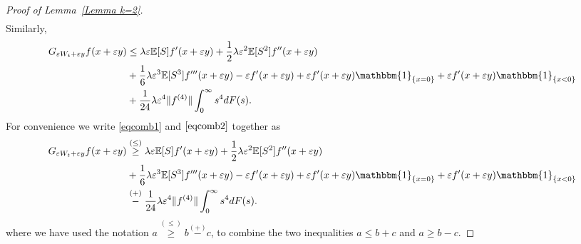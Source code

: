 \documentclass[10pt,a4paper]{amsart}
\begin{document}
\begin{proof}[Proof of Lemma~\ref{Lemma k=2}]
\begin{align}
\end{align}
Similarly,
\begin{align}\label{eqcomb2}
    G_{\varepsilon W_t+\varepsilon y}f(x+\varepsilon y)
      &\leq \lambda \varepsilon \mathbb E[S]f'(x+\varepsilon y)+\frac{1}{2}\lambda \varepsilon^2 \mathbb E[S^2]f''(x+\varepsilon y) \nonumber \\
     &+\frac{1}{6}\lambda \varepsilon^3 \mathbb E[S^3]f'''(x+\varepsilon y)-\varepsilon f'(x+\varepsilon y)+\varepsilon f'(x+\varepsilon y)\mathbbm{1}_{\{x=0\}}+\varepsilon f'(x+\varepsilon y)\mathbbm{1}_{\{x<0\}}\nonumber \\
     &+\frac{1}{24}\lambda \varepsilon^4  \|f^{(4)}\|\int_0^\infty s^4 dF(s).
\end{align}
For convenience we write \eqref{eqcomb1} and $\eqref{eqcomb2}$ together as 
\begin{align}\label{eqcomb2.1}
       G_{\varepsilon W_t+\varepsilon y}f(x+\varepsilon y) 
     &\stackrel{(\leq)}{\geq} \lambda \varepsilon \mathbb E[S]f'(x+\varepsilon y)+\frac{1}{2}\lambda \varepsilon^2 \mathbb E[S^2]f''(x+\varepsilon y)\nonumber \\
     &+\frac{1}{6}\lambda \varepsilon^3 \mathbb E[S^3]f'''(x+\varepsilon y)-\varepsilon f'(x+\varepsilon y)+\varepsilon f'(x+\varepsilon y)\mathbbm{1}_{\{x=0\}}+\varepsilon f'(x+\varepsilon y)\mathbbm{1}_{\{x<0\}}\nonumber \\
     &\stackrel{(+)}{-}\frac{1}{24}\lambda \varepsilon^4  \|f^{(4)}\|\int_0^\infty s^4 dF(s).
\end{align}
where we have used the notation $a \stackrel{(\leq)}{\geq} b \stackrel{(+)}{-} c$, to combine the two inequalities $a \leq b+c$ and $a \geq b-c$.


\end{proof}
\end{document}
